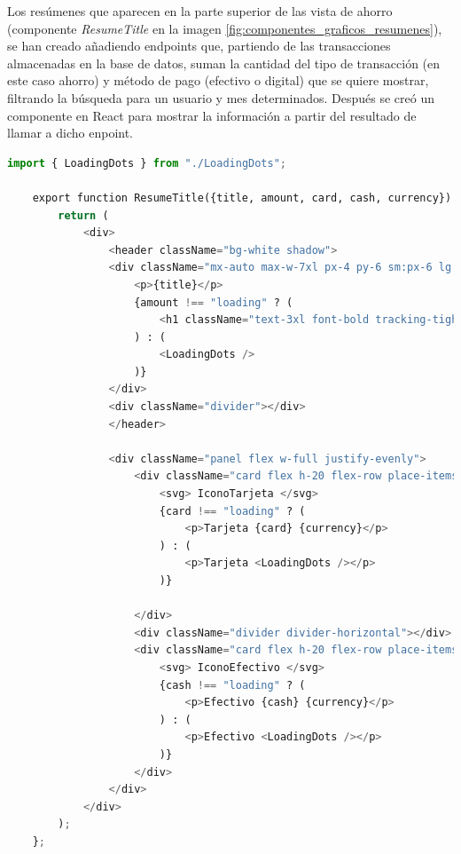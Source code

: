 Los resúmenes que aparecen en la parte superior de las vista de ahorro (componente \textit{ResumeTitle} en la imagen \ref{fig:componentes_graficos_resumenes}), se han creado añadiendo endpoints que, partiendo de las transacciones almacenadas en la base de datos, suman la cantidad del tipo de transacción (en este caso ahorro) y método de pago (efectivo o digital) que se quiere mostrar, filtrando la búsqueda para un usuario y mes determinados. Después se creó un componente en React para mostrar la información a partir del resultado de llamar a dicho enpoint.

\begin{lstlisting}[language=Python, caption=Componente de React para el resumen de gastos]
    import { LoadingDots } from "./LoadingDots";

    export function ResumeTitle({title, amount, card, cash, currency}) {
        return (
            <div>
                <header className="bg-white shadow">
                <div className="mx-auto max-w-7xl px-4 py-6 sm:px-6 lg:px-8">
                    <p>{title}</p>
                    {amount !== "loading" ? (
                        <h1 className="text-3xl font-bold tracking-tight text-gray-900">{amount} {currency}</h1>
                    ) : (
                        <LoadingDots />
                    )}
                </div>
                <div className="divider"></div>
                </header>
    
                <div className="panel flex w-full justify-evenly">
                    <div className="card flex h-20 flex-row place-items-center">
                        <svg> IconoTarjeta </svg>
                        {card !== "loading" ? (
                            <p>Tarjeta {card} {currency}</p>
                        ) : (
                            <p>Tarjeta <LoadingDots /></p>
                        )}
                        
                    </div>
                    <div className="divider divider-horizontal"></div>
                    <div className="card flex h-20 flex-row place-items-center">
                        <svg> IconoEfectivo </svg>
                        {cash !== "loading" ? (
                            <p>Efectivo {cash} {currency}</p>
                        ) : (
                            <p>Efectivo <LoadingDots /></p>
                        )}
                    </div>
                </div>
            </div>  
        );
    };
\end{lstlisting}


